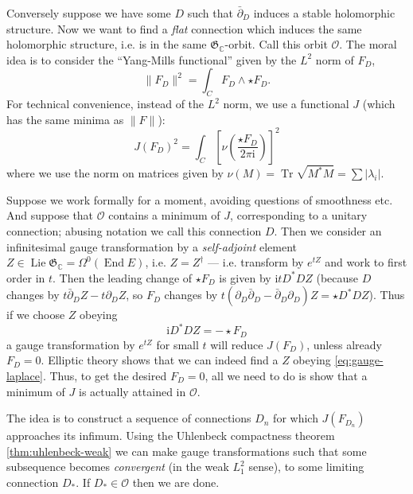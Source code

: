 \documentclass[12pt,letterpaper,reqno]{article}
\numberwithin{equation}{section}
\newcommand{\fG}{{\mathfrak G}}
\newcommand{\cO}{\ensuremath{\mathcal O}}
\newcommand{\C}{\ensuremath{\mathbb C}}
\newcommand{\I}{{\mathrm i}}
\newcommand{\abs}[1]{\lvert#1\rvert}
\newcommand{\norm}[1]{\lVert#1\rVert}
\newcommand{\ti}[1]{\textit{#1}}
\DeclareMathOperator{\Tr}{Tr}
\DeclareMathOperator{\End}{End}
\DeclareMathOperator{\Lie}{Lie}
\newcommand{\fixme}[1]{{\color{orange}{[#1]}}}
\begin{document}
\begin{pf}
Conversely suppose we have some $D$ such that $\bar\partial_D$ 
induces a stable holomorphic structure. Now we want to find a
\ti{flat} connection which induces the same holomorphic structure,
i.e. is in the same $\fG_\C$-orbit. Call this orbit $\cO$.
The moral idea is to consider the ``Yang-Mills functional''
given by the $L^2$ norm of $F_D$, 
\begin{equation}
 \norm{F_D}^2 = \int_C F_D \wedge \star F_D.
\end{equation}
For technical convenience, instead of the $L^2$ norm, we 
use a functional $J$
(which has the same minima as $\norm{F}$):
\begin{equation}
  J(F_D)^2 = \int_C \left[\nu\left(\frac{\star F_D}{2 \pi \I}\right)\right]^2
\end{equation}
where we use the norm on matrices given by
$\nu(M) = \Tr \sqrt{M^*M} = \sum \abs{\lambda_i}$.

Suppose we work formally for a moment, avoiding questions of
smoothness etc.
And suppose that $\cO$ contains a minimum of $J$, corresponding
to a unitary connection; abusing notation we call this connection $D$.
Then we consider an infinitesimal gauge transformation by
a \ti{self-adjoint} element 
$Z \in \Lie \fG_\C = \Omega^0(\End E)$, i.e. $Z = Z^\dagger$ ---
i.e. transform by $e^{tZ}$ and work to first order in $t$.
Then the leading change of $\star F_D$ is given by $\I t D^* D Z$
(because $D$ changes by $t \bar\partial_D Z - t \partial_D Z$,
so $F_D$ changes by $t (\partial_D \bar\partial_D - \bar\partial_D \partial_D) Z = \star D^* D Z$). \fixme{check sign}
Thus if we choose $Z$ obeying
\begin{equation} \label{eq:gauge-laplace}
  \I D^* D Z = -\star F_D
\end{equation}
a gauge transformation by $e^{t Z}$ for small $t$ 
will reduce $J(F_D)$, unless 
already $F_D = 0$. Elliptic theory shows that we can indeed
find a $Z$ obeying \eqref{eq:gauge-laplace}.
Thus, to get the desired $F_D = 0$, 
all we need to do is show that a
minimum of $J$ is actually attained in $\cO$.

The idea is to construct a 
sequence of connections $D_n$ for which 
$J(F_{D_n})$ approaches its infimum. 
Using the Uhlenbeck compactness
theorem \autoref{thm:uhlenbeck-weak} we can make gauge transformations
such that some subsequence becomes \ti{convergent}
(in the weak $L^2_1$ sense), to 
some limiting connection $D_*$. If 
$D_* \in \cO$ then we are done. 


\end{pf}
\end{document}
